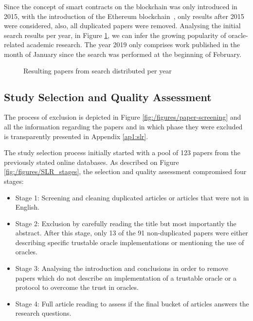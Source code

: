 \documentclass[final,3p,12pt,twocolumn]{elsarticle}
\begin{document}
Since the concept of smart contracts on the blockchain was only introduced in 2015, with the introduction of the Ethereum blockchain~\cite{GavinWood2014}, only results after 2015 were considered, also, all duplicated papers were removed. Analysing the initial search results per year, in Figure \ref{search-results-per-year}, we can infer the growing popularity of oracle-related academic research. The year 2019 only comprises work published in the month of January since the search was performed at the beginning of February.

\begin{figure}[H]
  \centering
  \caption{Resulting papers from search distributed per year}
  \label{search-results-per-year}
\end{figure}


\subsection{Study Selection and Quality Assessment}
The process of exclusion is depicted in Figure \ref{fig:/figures/paper-screening} and all the information regarding the papers and in which phase they were excluded is transparently presented in Appendix \ref{ap1:slr}.

The study selection process initially started with a pool of 123 papers from the previously stated online databases. As described on Figure \ref{fig:/figures/SLR_stages}, the selection and quality assessment compromised four stages:
\begin{itemize}
  \item Stage 1: Screening and cleaning duplicated articles or articles that were not in English.
  \item Stage 2: Exclusion by carefully reading the title but most importantly the abstract. After this stage, only 13 of the 91 non-duplicated papers were either describing specific trustable oracle implementations or mentioning the use of oracles.
  \item Stage 3: Analysing the introduction and conclusions in order to remove papers which do not describe an implementation of a trustable oracle or a protocol to overcome the trust in oracles.
  \item Stage 4: Full article reading to assess if the final bucket of articles answers the research questions.
\end{itemize}
\end{document}
